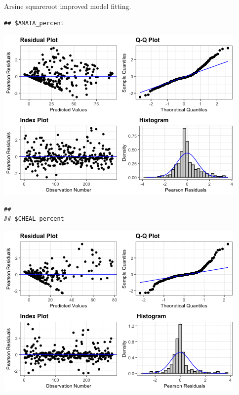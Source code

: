 \documentclass[
]{article}
\newenvironment{Shaded}{\begin{snugshade}}{\end{snugshade}}
\newcommand{\NormalTok}[1]{#1}
\newcommand{\SpecialCharTok}[1]{\textcolor[rgb]{0.81,0.36,0.00}{\textbf{#1}}}
\begin{document}
Arsine squareroot improved model fitting.

\begin{Shaded}
\end{Shaded}

\begin{verbatim}
## $AMATA_percent
\end{verbatim}

\includegraphics{Individual-sp-difference_files/figure-latex/unnamed-chunk-14-1.png}

\begin{verbatim}
## 
## $CHEAL_percent
\end{verbatim}

\includegraphics{Individual-sp-difference_files/figure-latex/unnamed-chunk-14-2.png}
\end{document}
